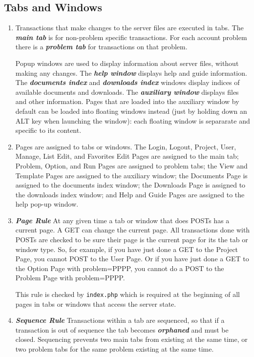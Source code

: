 \documentclass[12pt]{article}
\newcommand{\key}[1]{{\bf \em #1}}
\begin{document}
\subsection{Tabs and Windows}
\label{TABS-AND-WINDOWS}

\begin{enumerate}
\item Transactions that make changes to the server files
are executed in tabs.
The \key{main tab} is for non-problem specific
transactions.  For each account problem there is a
\key{problem tab} for transactions on that problem.

Popup windows are used to display information about server files,
without making any changes.  The \key{help window} displays help and
guide information.  The \key{documents index} and
\key{downloads index} windows display indices of
available documents and downloads.  The \key{auxiliary window}
displays files and other information.  Pages that are loaded into
the auxiliary window by default can be loaded into floating windows
instead (just by holding down an ALT key when launching the window):
each floating window is separarate and specific to its content.

\item Pages are assigned to tabs or windows.  The Login, Logout,
Project, User, Manage, List Edit, and Favorites Edit Pages are assigned
to the main tab;
Problem, Option, and Run Pages are assigned to problem tabs;
the View and Template Pages are assigned to the auxiliary
window; the Documents Page is assigned to the documents index window;
the Downloads Page is assigned to the downloads index window;
and Help and Guide Pages are assigned to the help pop-up
window.

\item \key{Page Rule}\label{PAGE-RULE}
At any given time a tab or window that does POSTs has a current page.
A GET can change the current page.  All
transactions done with POSTs
are checked to be sure their page is the current page for
its the tab or window type.  So, for example,
if you have just done a GET to the Project Page,
you cannot POST to the User Page.  Or if you have
just done a GET to the Option Page with problem=PPPP,
you cannot do a POST to the Problem Page with problem=PPPP.

This rule is checked by {\tt index.php} which is required
at the beginning of all pages in tabs or windows that
access the server state.

\item \key{Sequence Rule}\label{SEQUENCE-RULE}
Transactions within a tab are sequenced, so that
if a transaction is out of sequence the tab becomes
\key{orphaned} and must be closed.
Sequencing prevents two main
tabs from existing at the same time, or two problem tabs
for the same problem existing at the same time.


\end{enumerate}
\end{document}
